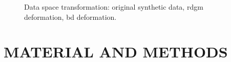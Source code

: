 \graphicspath{ {./content/method/figures/} }

\begin{figure}
	\hfill
	\hfill
	\caption{Data space transformation: \protect{} original synthetic data, \protect{} \acs*{rdgm} deformation, \protect{} \acs*{bd} deformation.}
	\label{fig:DSOS}
\end{figure}


\section{\uppercase{Material and Methods}}\label{sec:mm}


